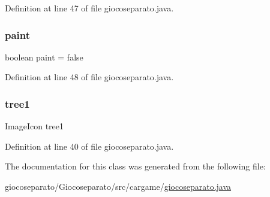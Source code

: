 Definition at line 47 of file giocoseparato.\+java.

\mbox{\label{classcargame_1_1giocoseparato_a88adf831b3879e064aff0ac1c19b8da3}} 
\subsubsection{\texorpdfstring{paint}{paint}}
{\footnotesize\ttfamily boolean paint = false\hspace{0.3cm}{\ttfamily [private]}}



Definition at line 48 of file giocoseparato.\+java.

\mbox{\label{classcargame_1_1giocoseparato_ae7ee0b8463d4706a05c52012d15ace23}} 
\subsubsection{\texorpdfstring{tree1}{tree1}}
{\footnotesize\ttfamily Image\+Icon tree1\hspace{0.3cm}{\ttfamily [private]}}



Definition at line 40 of file giocoseparato.\+java.



The documentation for this class was generated from the following file\+:\begin{DoxyCompactItemize}
\item 
giocoseparato/\+Giocoseparato/src/cargame/\hyperlink{giocoseparato_8java}{giocoseparato.\+java}\end{DoxyCompactItemize}

